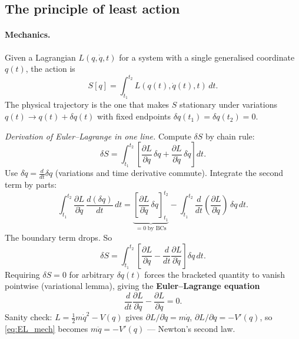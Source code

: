 \documentclass[12pt]{article}
\begin{document}
\subsection{The principle of least action}
\label{app:least_action}

\paragraph{Mechanics.}  Given a Lagrangian $L(q,\dot q,t)$ for a
system with a single generalised coordinate $q(t)$, the action is
%
\begin{equation}
  S[q] = \int_{t_1}^{t_2}\! L(q(t),\dot q(t), t)\,dt.
  \label{eq:action_mech}
\end{equation}
%
The physical trajectory is the one that makes $S$ stationary
under variations $q(t)\to q(t) + \delta q(t)$ with fixed endpoints
$\delta q(t_1) = \delta q(t_2) = 0$.

\emph{Derivation of Euler--Lagrange in one line.}  Compute
$\delta S$ by chain rule:
%
\begin{equation}
  \delta S
    = \int_{t_1}^{t_2}\!
        \left[
          \frac{\partial L}{\partial q}\,\delta q
          + \frac{\partial L}{\partial\dot q}\,\delta\dot q
        \right] dt.
\end{equation}
%
Use $\delta\dot q = \frac{d}{dt}\delta q$ (variations and time
derivative commute).  Integrate the second term by parts:
%
\begin{equation}
  \int_{t_1}^{t_2}\!\frac{\partial L}{\partial\dot q}\,
    \frac{d(\delta q)}{dt}\,dt
   = \underbrace{\left[\frac{\partial L}{\partial\dot q}\,\delta q\right]_{t_1}^{t_2}}_{=0\;\text{by BCs}}
     - \int_{t_1}^{t_2}\!\frac{d}{dt}\!\left(\frac{\partial L}{\partial\dot q}\right)\,\delta q\,dt.
\end{equation}
%
The boundary term drops.  So
%
\begin{equation}
  \delta S = \int_{t_1}^{t_2}\!
     \left[
       \frac{\partial L}{\partial q}
       - \frac{d}{dt}\!\frac{\partial L}{\partial\dot q}
     \right]\delta q\,dt.
\end{equation}
%
Requiring $\delta S = 0$ for arbitrary $\delta q(t)$ forces the
bracketed quantity to vanish pointwise (variational lemma),
giving the \textbf{Euler--Lagrange equation}
%
\begin{equation}
  \frac{d}{dt}\!\frac{\partial L}{\partial\dot q}
    - \frac{\partial L}{\partial q} = 0.
  \label{eq:EL_mech}
\end{equation}
%
Sanity check: $L = \tfrac{1}{2}m\dot q^2 - V(q)$ gives
$\partial L/\partial\dot q = m\dot q$, $\partial L/\partial q =
-V'(q)$, so \eqref{eq:EL_mech} becomes $m\ddot q = -V'(q)$ --- Newton's
second law.
\end{document}
